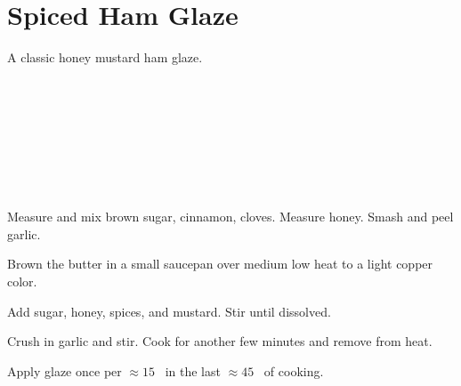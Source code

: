 \section[Spiced Ham Glaze]{Spiced Ham Glaze}

\begin{recipestats}[
        servings=6 \pound,
        preptime=10 \minute,
        bakingtime=10 \minute,
    ]
\end{recipestats}

\begin{recipeabstract}
    A classic honey mustard ham glaze.
\end{recipeabstract}

\begin{ingredientcolumns}
    \begin{ingredientblock}
        \\
        \\
        \\
        \\
    \end{ingredientblock}
    \begin{ingredientblock}
        \\
        \\
    \end{ingredientblock}
\end{ingredientcolumns}

\begin{preparation}
\item Measure and mix brown sugar, cinnamon, cloves.
    Measure honey.
    Smash and peel garlic.

\item Brown the butter in a small saucepan over medium low heat to a light copper color.

\item Add sugar, honey, spices, and mustard.
    Stir until dissolved.

\item Crush in garlic and stir.
    Cook for another few minutes and remove from heat.

\item Apply glaze once per $\approx 15$ \minute~in the last $\approx 45$ \minute~of cooking.
\end{preparation}

\recipeend%

